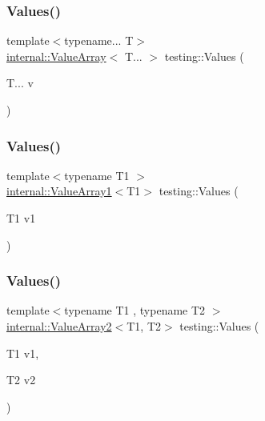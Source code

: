\mbox{\label{namespacetesting_abd3c87b40c2a0663691c9b617ed5fcc2}} 
\subsubsection{\texorpdfstring{Values()}{Values()}\hspace{0.1cm}{\footnotesize\ttfamily [1/51]}}
{\footnotesize\ttfamily template$<$typename... T$>$ \\
\mbox{\hyperlink{classtesting_1_1internal_1_1_value_array}{internal\+::\+Value\+Array}}$<$ T... $>$ testing\+::\+Values (\begin{DoxyParamCaption}\item[{T...}]{v }\end{DoxyParamCaption})}

\mbox{\label{namespacetesting_a8209ef59db08b8ad4beed30d8d6e6a88}} 
\subsubsection{\texorpdfstring{Values()}{Values()}\hspace{0.1cm}{\footnotesize\ttfamily [2/51]}}
{\footnotesize\ttfamily template$<$typename T1 $>$ \\
\mbox{\hyperlink{classtesting_1_1internal_1_1_value_array1}{internal\+::\+Value\+Array1}}$<$T1$>$ testing\+::\+Values (\begin{DoxyParamCaption}\item[{T1}]{v1 }\end{DoxyParamCaption})}

\mbox{\label{namespacetesting_a7cfec131dd8773430fb87483509cc6d0}} 
\subsubsection{\texorpdfstring{Values()}{Values()}\hspace{0.1cm}{\footnotesize\ttfamily [3/51]}}
{\footnotesize\ttfamily template$<$typename T1 , typename T2 $>$ \\
\mbox{\hyperlink{classtesting_1_1internal_1_1_value_array2}{internal\+::\+Value\+Array2}}$<$T1, T2$>$ testing\+::\+Values (\begin{DoxyParamCaption}\item[{T1}]{v1,  }\item[{T2}]{v2 }\end{DoxyParamCaption})}

